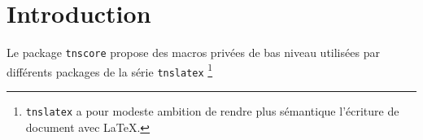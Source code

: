 \documentclass[12pt,a4paper]{article}
\begin{document}
\section{Introduction}

Le package \verb#tnscore# propose des macros privées de bas niveau utilisées par différents packages de la série \verb#tnslatex# 
\footnote{
	\texttt{tnslatex} a pour modeste ambition de rendre plus sémantique l'écriture de document avec \LaTeX.
}
\end{document}
